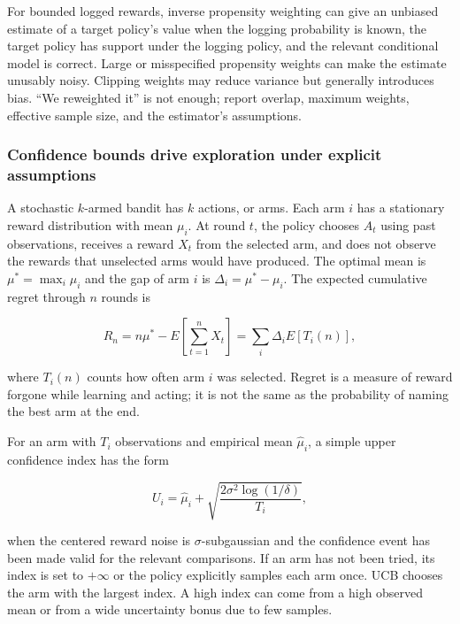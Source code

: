 For bounded logged rewards, inverse propensity weighting can give an unbiased estimate of a target policy's value when the logging probability is known, the target policy has support under the logging policy, and the relevant conditional model is correct. Large or misspecified propensity weights can make the estimate unusably noisy. Clipping weights may reduce variance but generally introduces bias. ``We reweighted it'' is not enough; report overlap, maximum weights, effective sample size, and the estimator's assumptions.

\subsubsection{Confidence bounds drive exploration under explicit assumptions}\label{02-foundations-ii-ch029-confidence-bounds-drive-exploration-under-explicit-assumptions}

\hypertarget{02-foundations-ii-ch029-confidence-bounds-drive-exploration-under-explicit-assumptions}{}

A stochastic \(k\)-armed bandit has \(k\) actions, or arms. Each arm \(i\) has a stationary reward distribution with mean \(\mu_i\). At round \(t\), the policy chooses \(A_t\) using past observations, receives a reward \(X_t\) from the selected arm, and does not observe the rewards that unselected arms would have produced. The optimal mean is \(\mu^*=\max_i\mu_i\) and the gap of arm \(i\) is \(\Delta_i=\mu^*-\mu_i\). The expected cumulative regret through \(n\) rounds is

\[
R_n=n\mu^*-E\left[\sum_{t=1}^n X_t\right]
=\sum_i\Delta_i E[T_i(n)],
\]

where \(T_i(n)\) counts how often arm \(i\) was selected. Regret is a measure of reward forgone while learning and acting; it is not the same as the probability of naming the best arm at the end.

For an arm with \(T_i\) observations and empirical mean \(\hat\mu_i\), a simple upper confidence index has the form

\[
U_i=\hat\mu_i+\sqrt{\frac{2\sigma^2\log(1/\delta)}{T_i}},
\]

when the centered reward noise is \(\sigma\)-subgaussian and the confidence event has been made valid for the relevant comparisons. If an arm has not been tried, its index is set to \(+\infty\) or the policy explicitly samples each arm once. UCB chooses the arm with the largest index. A high index can come from a high observed mean or from a wide uncertainty bonus due to few samples.

